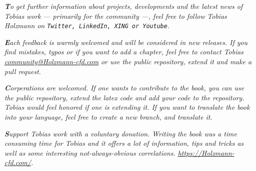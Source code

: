 \documentclass[LBMDerivation.tex]{subfiles}
\begin{document}
%
%
\vspace{20pt}
%
%
\textit{
    \textbf{T}o get further information about projects, developments and the
    latest news of Tobias work --- primarily for the community ---, feel free to
    follow Tobias Holzmann on \texttt{Twitter, LinkedIn, XING or Youtube}.
}

%
%
\vspace{20pt}
%
%
\textit{
    \textbf{E}ach feedback is warmly welcomed and will be considered in new
    releases. If you find mistakes, typos or if you want to add a chapter,
    feel free to contact Tobias \href{mailto:community@Holzmann-cfd.com}{\color{myCiteColor}community@Holzmann-cfd.com}
    or use the public repository, extend it and make a pull request.
}

%
%
\vspace{20pt}
%
%
\textit{
    \textbf{C}orperations are welcomed. If one wants to contribute to the book,
    you can use the public repository, extend the latex code and add your
    code to the repository. Tobias would feel honored if one is extending it.
    If you want to translate the book into your language, feel free to create
    a new branch, and translate it.
}

%
%
\vspace{20pt}
%
%
\textit{
    \textbf{S}upport Tobias work with a voluntary donation. Writing the book
    was a time consuming time for Tobias and it offers a lot of information,
    tips and tricks as well as some interesting not-always-obvious correlations.
    \url{https://Holzmann-cfd.com/}.
}

%
%
\newpage


\end{document}
